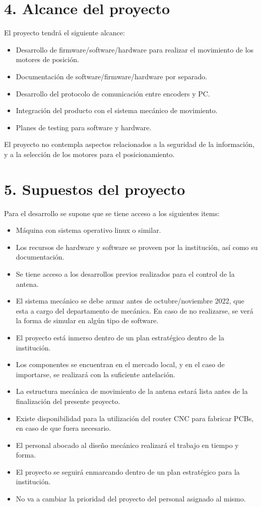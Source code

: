 \documentclass[11pt, %
codirector, %
]{charter}
\begin{document}
\section{4. Alcance del proyecto}
\label{sec:alcance}
El proyecto tendrá el siguiente alcance: 
\begin{itemize}
	\item Desarrollo de firmware/software/hardware para realizar el movimiento de los motores de posición. 
	\item  Documentación de software/firmware/hardware por separado.
	\item  Desarrollo del protocolo de comunicación entre encoders y PC.
	\item  Integración del producto con el sistema mecánico de movimiento.
	\item Planes de testing para software y hardware. 
	
\end{itemize}

El proyecto no contempla aspectos relacionados a la seguridad de la información, y a la selección de los motores para el posicionamiento.  


\section{5. Supuestos del proyecto}
\label{sec:supuestos}
	Para el desarrollo se supone que se tiene acceso a los siguientes items: 
	\begin{itemize}
		\item Máquina con sistema operativo linux o similar. 
		\item Los recursos de hardware y software se proveen por la institución, así como su documentación.
		\item Se tiene acceso a los desarrollos previos realizados para el control de la antena. 
		\item El sistema mecánico se debe armar antes de octubre/noviembre 2022, que esta a cargo del departamento de mecánica. En caso de no realizarse, se verá la forma de simular en algún tipo de software. 
		\item El proyecto está inmerso dentro de un plan estratégico dentro de la institución. 
		\item Los componentes se encuentran en el mercado local, y en el caso de importarse, se realizará con la suficiente antelación. 
		\item La estructura mecánica de movimiento de la antena estará lista antes de la finalización del presente proyecto. 
		\item Existe disponibilidad para la utilización del router CNC para fabricar PCBs, en caso de que fuera necesario. 
		\item El personal abocado al diseño mecánico realizará el trabajo en tiempo y forma.  
		\item El proyecto se seguirá enmarcando dentro de un plan estratégico para la institución.  
		\item No va a cambiar la prioridad del proyecto del personal asignado al mismo.  
 

	\end{itemize}
	
\end{document}
